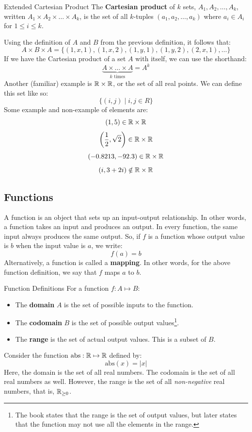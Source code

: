 \documentclass[letterpaper]{article}
\begin{document}
\begin{definition}{Extended Cartesian Product}{}
    The \textbf{Cartesian product} of $k$ sets, $A_1, A_2, \dots, A_k$, written $A_1 \times A_2 \times \dots \times A_k$, is the set of all $k$-tuples $(a_1, a_2, \dots, a_k)$ where $a_i \in A_i$ for $1 \leq i \leq k$. 
\end{definition}
Using the definition of $A$ and $B$ from the previous definition, it follows that: 
\[A \times B \times A = \{(1, x, 1), (1, x, 2), (1, y, 1), (1, y, 2), (2, x, 1), \dots\}\]
If we have the Cartesian product of a set $A$ with itself, we can use the shorthand: 
\[\underbrace{A \times \dots \times A}_{k \text{ times}} = A^k\]
Another (familiar) example is $\mathbb{R} \times \mathbb{R}$, or the set of all real points. We can define this set like so: 
\[\{(i, j) \mid i, j \in R\}\]
Some example and non-example of elements are: 
\[(1, 5) \in \mathbb{R} \times \mathbb{R}\]
\[\left(\frac{1}{2}, \sqrt{2}\right) \in \mathbb{R} \times \mathbb{R}\]
\[(-0.8213, -92.3) \in \mathbb{R} \times \mathbb{R}\]
\[(i, 3 + 2i) \notin \mathbb{R} \times \mathbb{R}\]


\subsection{Functions}
A function is an object that sets up an input-output relationship. In other words, a function takes an input and produces an output. In every function, the same input always produces the same output. So, if $f$ is a function whose output value is $b$ when the input value is $a$, we write:
\[f(a) = b\]
Alternatively, a function is called a \textbf{mapping}. In other words, for the above function definition, we say that $f$ maps $a$ to $b$. 

\begin{definition}{Function Definitions}{}
    For a function $f: A \mapsto B$:
    \begin{itemize}
        \item The \textbf{domain} $A$ is the set of possible inputs to the function.
        \item The \textbf{codomain} $B$ is the set of possible output values\footnote{The book states that the range is the set of output values, but later states that the function may not use all the elements in the range.}. 
        \item The \textbf{range} is the set of actual output values. This is a subset of $B$.
    \end{itemize}
\end{definition}
Consider the function $\text{abs}: \mathbb{R} \mapsto \mathbb{R}$ defined by:
\[\text{abs}(x) = |x|\]
Here, the domain is the set of all real numbers. The codomain is the set of all real numbers as well. However, the range is the set of all \emph{non-negative} real numbers, that is, $\mathbb{R}_{\geq 0}$.
\end{document}
